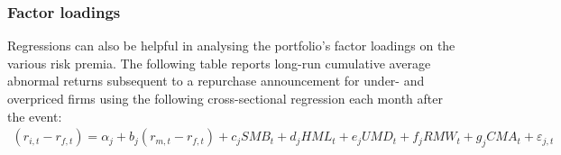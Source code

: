 \documentclass[xcolor=dvipsnames, english, 8pt]{beamer}
\begin{document}
\begin{frame}
\frametitle{Factor loadings}

Regressions can also be helpful in analysing the portfolio's factor loadings on the various risk premia. The following table reports long-run cumulative average abnormal returns subsequent to a repurchase announcement for under- and overpriced firms using the following cross-sectional regression each month after the event:
\begin{align}
 (r_{i,t} -r_{f,t}) = \alpha_j + b_j(r_{m,t} -r_{f,t}) + c_j SMB_t + d_j HML_t + e_j UMD_t + f_j RMW_t + g_j CMA_t + \varepsilon_{j,t}
\end{align}
 \begin{footnotesize}
\begin{center}
\begin{tabular}{lcccccc}
\toprule


\end{tabular}
\end{center}
\end{footnotesize}
\end{frame}
\end{document}
